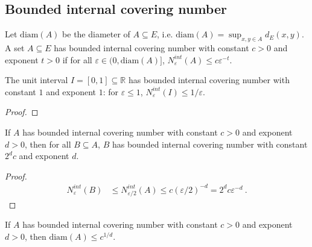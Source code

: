 \subsection{Bounded internal covering number}

\begin{definition}\label{def:HasBoundedInternalCoveringNumber}
  \mathlibok
  Let $\mathrm{diam}(A)$ be the diameter of $A \subseteq E$, i.e. $\mathrm{diam}(A) = \sup_{x,y \in A} d_E(x, y)$.
  A set $A \subseteq E$ has bounded internal covering number with constant $c>0$ and exponent $t>0$ if for all $\varepsilon \in (0, \mathrm{diam}(A)]$, $N^{int}_\varepsilon(A) \le c \varepsilon^{-t}$.
\end{definition}


\begin{lemma}\label{lem:hasBoundedInternalCoveringNumber_unitInterval}
  \leanok
The unit interval $I = [0, 1] \subseteq \mathbb{R}$ has bounded internal covering number with constant $1$ and exponent $1$: for $\varepsilon \le 1$, $N^{int}_\varepsilon(I) \le 1/\varepsilon$.
\end{lemma}

\begin{proof}\leanok

\end{proof}


\begin{lemma}\label{lem:hasBoundedInternalCoveringNumber_subset}
  \mathlibok
If $A$ has bounded internal covering number with constant $c>0$ and exponent $d>0$, then for all $B \subseteq A$, $B$ has bounded internal covering number with constant $2^d c$ and exponent $d$.
\end{lemma}

\begin{proof}\leanok
\begin{align*}
  N^{int}_\varepsilon(B)
  &\le N^{int}_{\varepsilon/2}(A)
  \le c (\varepsilon/2)^{-d}
  = 2^d c \varepsilon^{-d}
  \: .
\end{align*}
\end{proof}


\begin{lemma}\label{lem:hasBoundedInternalCoveringNumber_diam_le}
  \leanok
If $A$ has bounded internal covering number with constant $c>0$ and exponent $d>0$, then $\mathrm{diam}(A) \le c^{1/d}$.
\end{lemma}

